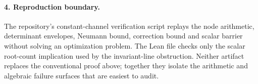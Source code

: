 \documentclass[11pt]{article}
\theoremstyle{remark}
\begin{document}
\paragraph{4. Reproduction boundary.}
The repository's constant-channel verification script replays the node
arithmetic, determinant envelopes, Neumann bound, correction bound and scalar
barrier without solving an optimization problem.  The Lean file checks only
the scalar root-count implication used by the invariant-line obstruction.
Neither artifact replaces the conventional proof above; together they isolate
the arithmetic and algebraic failure surfaces that are easiest to audit.

\footnotesize


\end{document}
